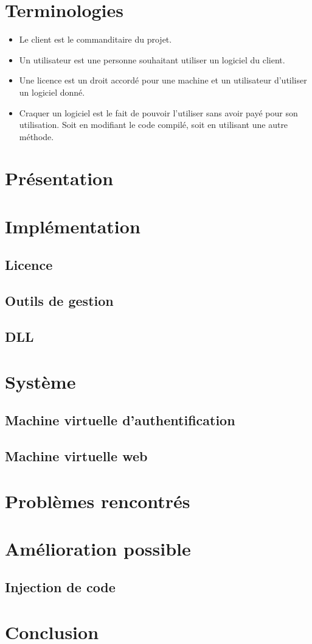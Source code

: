\chapter{Terminologies}

\begin{itemize}
	\item Le client est le commanditaire du projet.
	\item Un utilisateur est une personne souhaitant utiliser un logiciel du client. 
	\item Une licence est un droit accordé pour une machine et un utilisateur d'utiliser un logiciel donné.
	\item Craquer un logiciel est le fait de pouvoir l'utiliser sans avoir payé pour son utilisation. 
	Soit en modifiant le code compilé, soit en utilisant une autre méthode. 
\end{itemize}

\chapter{Présentation}

\chapter{Implémentation}

\section{Licence}

\section{Outils de gestion}

\section{DLL}

\chapter{Système}

\section{Machine virtuelle d'authentification}

\section{Machine virtuelle web}

\chapter{Problèmes rencontrés}

\chapter{Amélioration possible}

\section{Injection de code}

\chapter{Conclusion}
\label{chapter:bilan}


